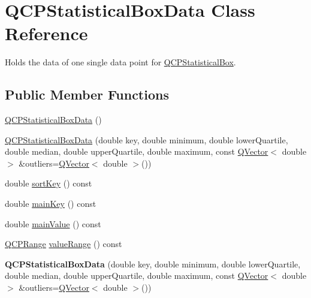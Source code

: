 \hypertarget{class_q_c_p_statistical_box_data}{}\section{Q\+C\+P\+Statistical\+Box\+Data Class Reference}
\label{class_q_c_p_statistical_box_data}


Holds the data of one single data point for \hyperlink{class_q_c_p_statistical_box}{Q\+C\+P\+Statistical\+Box}.  


\subsection*{Public Member Functions}
\begin{DoxyCompactItemize}
\item 
\hyperlink{class_q_c_p_statistical_box_data_ab96c4b93670a8dcac8a3d4080fd722ee}{Q\+C\+P\+Statistical\+Box\+Data} ()
\item 
\hyperlink{class_q_c_p_statistical_box_data_a66b0c6d39765d0feb49c286fba4e4ef5}{Q\+C\+P\+Statistical\+Box\+Data} (double key, double minimum, double lower\+Quartile, double median, double upper\+Quartile, double maximum, const \hyperlink{class_q_vector}{Q\+Vector}$<$ double $>$ \&outliers=\hyperlink{class_q_vector}{Q\+Vector}$<$ double $>$())
\item 
double \hyperlink{class_q_c_p_statistical_box_data_a168100275e85935207deec86216abc88}{sort\+Key} () const
\item 
double \hyperlink{class_q_c_p_statistical_box_data_a4bbbf44f60ac5eca73c5f4135741562e}{main\+Key} () const
\item 
double \hyperlink{class_q_c_p_statistical_box_data_a0df3cb31cfd6d48decf6173297b81746}{main\+Value} () const
\item 
\hyperlink{class_q_c_p_range}{Q\+C\+P\+Range} \hyperlink{class_q_c_p_statistical_box_data_a1a2410fcf3d45fa3a1ad09e265b9bcad}{value\+Range} () const
\item 
\mbox{\label{class_q_c_p_statistical_box_data_a66b0c6d39765d0feb49c286fba4e4ef5}} 
{\bfseries Q\+C\+P\+Statistical\+Box\+Data} (double key, double minimum, double lower\+Quartile, double median, double upper\+Quartile, double maximum, const \hyperlink{class_q_vector}{Q\+Vector}$<$ double $>$ \&outliers=\hyperlink{class_q_vector}{Q\+Vector}$<$ double $>$())
\item 
\mbox{\label{class_q_c_p_statistical_box_data_a168100275e85935207deec86216abc88}} 

\end{DoxyCompactItemize}

